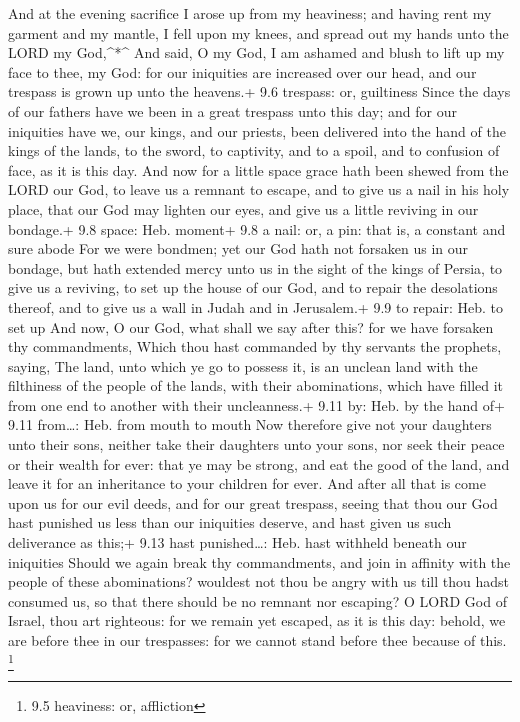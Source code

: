  And at the evening sacrifice I arose up from my heaviness;
and having rent my garment and my mantle, I fell upon my knees, and
spread out my hands unto the LORD my God,\^{}*\^{}  And
said, O my God, I am ashamed and blush to lift up my face to thee, my
God: for our iniquities are increased over our head, and our trespass is
grown up unto the heavens.+ 9.6 trespass: or, guiltiness 
Since the days of our fathers have we been in a great trespass unto this
day; and for our iniquities have we, our kings, and our priests, been
delivered into the hand of the kings of the lands, to the sword, to
captivity, and to a spoil, and to confusion of face, as it is this day.
 And now for a little space grace hath been shewed from the
LORD our God, to leave us a remnant to escape, and to give us a nail in
his holy place, that our God may lighten our eyes, and give us a little
reviving in our bondage.+ 9.8 space: Heb. moment+ 9.8 a nail: or, a pin:
that is, a constant and sure abode  For we were bondmen; yet
our God hath not forsaken us in our bondage, but hath extended mercy
unto us in the sight of the kings of Persia, to give us a reviving, to
set up the house of our God, and to repair the desolations thereof, and
to give us a wall in Judah and in Jerusalem.+ 9.9 to repair: Heb. to set
up  And now, O our God, what shall we say after this? for
we have forsaken thy commandments,  Which thou hast
commanded by thy servants the prophets, saying, The land, unto which ye
go to possess it, is an unclean land with the filthiness of the people
of the lands, with their abominations, which have filled it from one end
to another with their uncleanness.+ 9.11 by: Heb. by the hand of+ 9.11
from\ldots: Heb. from mouth to mouth  Now therefore give
not your daughters unto their sons, neither take their daughters unto
your sons, nor seek their peace or their wealth for ever: that ye may be
strong, and eat the good of the land, and leave it for an inheritance to
your children for ever.  And after all that is come upon us
for our evil deeds, and for our great trespass, seeing that thou our God
hast punished us less than our iniquities deserve, and hast given us
such deliverance as this;+ 9.13 hast punished\ldots: Heb. hast withheld
beneath our iniquities  Should we again break thy
commandments, and join in affinity with the people of these
abominations? wouldest not thou be angry with us till thou hadst
consumed us, so that there should be no remnant nor escaping?
 O LORD God of Israel, thou art righteous: for we remain
yet escaped, as it is this day: behold, we are before thee in our
trespasses: for we cannot stand before thee because of this. \footnote{9.5
  heaviness: or, affliction}


